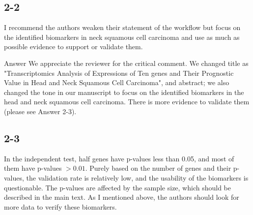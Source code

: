 \documentclass[preprint,12pt]{elsarticle}
\newenvironment{MyColorPar}[1]{%
    \leavevmode\color{#1}\ignorespaces%
}{%
}%
\begin{document}



%

\subsection*{2-2}
I recommend the authors weaken their statement of the workflow but focus on the identified biomarkers in neck squamous cell carcinoma and use as much as possible evidence to support or validate them. %


%
\begin{MyColorPar}{blue}
Answer
We appreciate the reviewer for the critical comment.
We changed title as "Transcriptomics Analysis of Expressions of Ten genes and Their Prognostic Value in Head and Neck Squamous Cell Carcinoma", and abstract; we also changed the tone in our manuscript to focus on the identified biomarkers in the head and neck squamous cell carcinoma.
There is more evidence to validate them (please see Answer 2-3).

%
\end{MyColorPar}



\subsection*{2-3}

In the independent test, half genes have p-values less than 0.05, and most of them have p-values $> 0.01$. %
Purely based on the number of genes and their p-values, the validation rate is relatively low, and the usability of the biomarkers is questionable. %
The p-values are affected by the sample size, which should be described in the main text. %
As I mentioned above, the authors should look for more data to verify these biomarkers. %
\end{document}
